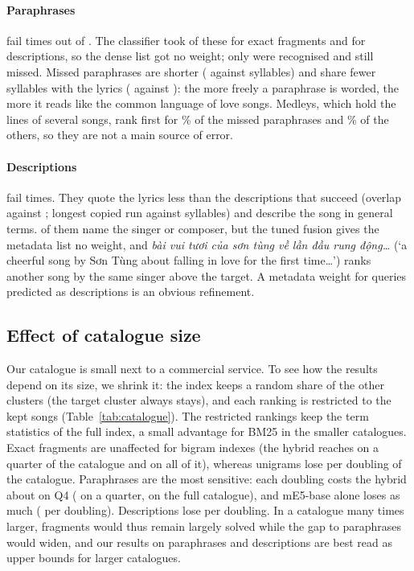\documentclass[11pt]{article}
\newcommand{\vi}[1]{\textit{#1}}          %
\newcommand{\gloss}[1]{`#1'}
\newcommand{\Qfour}{Q4\xspace}
\begin{document}
\paragraph{Paraphrases} fail \ErrQfourFail{} times out of \ErrQfourN. The classifier took \ErrQfourPredQone{}
of these for exact fragments and \ErrQfourPredQfive{} for descriptions, so the dense list got no weight; only
\ErrQfourPredQfour{} were recognised and still missed. Missed paraphrases are shorter (\ErrQfourLenFail{}
against \ErrQfourLenOk{} syllables) and share fewer syllables with the lyrics (\ErrQfourOverlapFail{} against
\ErrQfourOverlapOk): the more freely a paraphrase is worded, the more it reads like the common language of
love songs. Medleys, which hold the lines of several songs, rank first for \ErrQfourMedleyFail\% of the missed
paraphrases and \ErrQfourMedleyOk\% of the others, so they are not a main source of error.

\paragraph{Descriptions} fail \ErrQfiveFail{} times. They quote the lyrics less than the descriptions that
succeed (overlap \ErrQfiveOverlapFail{} against \ErrQfiveOverlapOk; longest copied run \ErrQfiveRunFail{}
against \ErrQfiveRunOk{} syllables) and describe the song in general terms. \ErrQfiveArtistFailN{} of them
name the singer or composer, but the tuned fusion gives the metadata list no weight, and \vi{bài vui tươi của
sơn tùng về lần đầu rung động\dots} (\gloss{a cheerful song by Sơn Tùng about falling in love for the first
time\dots}) ranks another song by the same singer above the target. A metadata weight for queries predicted
as descriptions is an obvious refinement.

\subsection{Effect of catalogue size}\label{sec:res_catalogue}

Our catalogue is small next to a commercial service. To see how the results depend on its size, we shrink it:
the index keeps a random share of the other clusters (the target cluster always stays), and each ranking is
restricted to the kept songs (Table~\ref{tab:catalogue}). The restricted rankings keep the term statistics of
the full index, a small advantage for BM25 in the smaller catalogues. Exact fragments are unaffected for bigram
indexes (the hybrid reaches \CatHybNaftAdaptiveOneQuarter{} on a quarter of the catalogue and
\CatHybNaftAdaptiveOneFull{} on all of it), whereas unigrams lose \CatSylOneDrop{} per doubling of the
catalogue. Paraphrases are the most sensitive: each doubling costs the hybrid about
\CatHybNaftAdaptiveFourDrop{} on \Qfour{} (\CatHybNaftAdaptiveFourQuarter{} on a quarter,
\CatHybNaftAdaptiveFourFull{} on the full catalogue), and mE5-base alone loses as much
(\CatDenseEbaseRestFourDrop{} per doubling). Descriptions lose \CatHybNaftAdaptiveFiveDrop{} per doubling. In
a catalogue many times larger, fragments would thus remain largely solved while the gap to paraphrases would
widen, and our results on paraphrases and descriptions are best read as upper bounds for larger catalogues.
\end{document}
